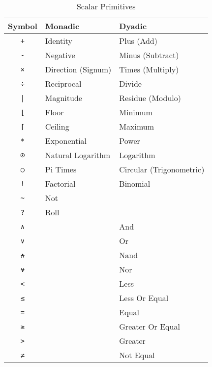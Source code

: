 \documentclass[numbers,preprint]{sigplanconf}
\begin{document}
\begin{table}
\centering
\begin{tabular}{cll}
\toprule
Symbol                   & Monadic            & Dyadic \\
\midrule
\texttt{+}               & Identity           & Plus (Add) \\
\texttt{-}               & Negative           & Minus (Subtract) \\
\texttt{×}               & Direction (Signum) & Times (Multiply) \\
\texttt{÷}               & Reciprocal         & Divide \\
\texttt{|}               & Magnitude          & Residue (Modulo) \\
\texttt{⌊}               & Floor              & Minimum \\
\texttt{⌈}               & Ceiling            & Maximum \\
\texttt{*}               & Exponential        & Power \\
\texttt{⍟}               & Natural Logarithm  & Logarithm \\
\texttt{○}               & Pi Times           & Circular (Trigonometric) \\
\texttt{!}               & Factorial          & Binomial \\
\texttt{\textasciitilde} & Not                & \\
\texttt{?}               & Roll               & \\
\texttt{∧}              &                    & And \\
\texttt{∨}               &                    & Or \\
\texttt{⍲}               &                    & Nand \\
\texttt{⍱}               &                    & Nor \\
\texttt{<}               &                    & Less \\
\texttt{≤}               &                    & Less Or Equal \\
\texttt{=}               &                    & Equal \\
\texttt{≥}               &                    & Greater Or Equal \\
\texttt{>}               &                    & Greater \\
\texttt{≠}               &                    & Not Equal \\
\end{tabular}
\caption{Scalar Primitives}
\label{tab:scalarprims}
\end{table}
\end{document}
